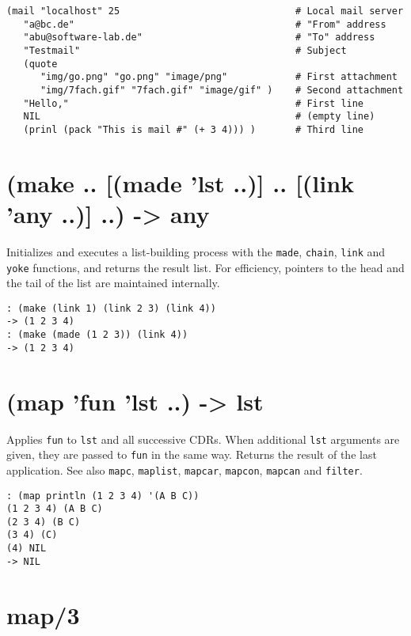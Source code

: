 {{{{{{{\begin{verbatim}
(mail "localhost" 25                               # Local mail server
   "a@bc.de"                                       # "From" address
   "abu@software-lab.de"                           # "To" address
   "Testmail"                                      # Subject
   (quote
      "img/go.png" "go.png" "image/png"            # First attachment
      "img/7fach.gif" "7fach.gif" "image/gif" )    # Second attachment
   "Hello,"                                        # First line
   NIL                                             # (empty line)
   (prinl (pack "This is mail #" (+ 3 4))) )       # Third line
\end{verbatim}

 
\section{(make .. [(made 'lst ..)] .. [(link 'any ..)] ..) -> any}
\label{sec-8-1-13-6}


Initializes and executes a list-building process with the \texttt{made},
\texttt{chain}, \texttt{link} and \texttt{yoke} functions, and returns the result list. For
efficiency, pointers to the head and the tail of the list are maintained
internally.


\begin{verbatim}
: (make (link 1) (link 2 3) (link 4))
-> (1 2 3 4)
: (make (made (1 2 3)) (link 4))
-> (1 2 3 4)
\end{verbatim}

 
\section{(map 'fun 'lst ..) -> lst}
\label{sec-8-1-13-7}


Applies \texttt{fun} to \texttt{lst} and all successive CDRs. When additional \texttt{lst}
arguments are given, they are passed to \texttt{fun} in the same way. Returns
the result of the last application. See also \texttt{mapc}, \texttt{maplist},
\texttt{mapcar}, \texttt{mapcon}, \texttt{mapcan} and \texttt{filter}.


\begin{verbatim}
: (map println (1 2 3 4) '(A B C))
(1 2 3 4) (A B C)
(2 3 4) (B C)
(3 4) (C)
(4) NIL
-> NIL
\end{verbatim}

 
\section{map/3}
\label{sec-8-1-13-8}


}}}}}}}

